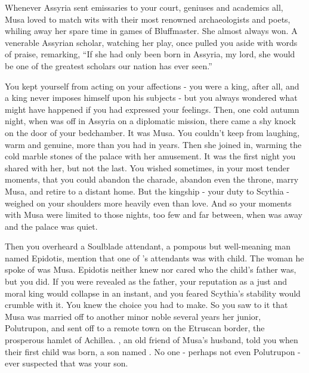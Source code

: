 \documentclass[char]{Kos}
\begin{document}
    Whenever Assyria sent emissaries to your court, geniuses and academics all, Musa loved to match wits with their most renowned archaeologists and poets, whiling away her spare time in games of Bluffmaster. She almost always won. A venerable Assyrian scholar, watching her play, once pulled you aside with words of praise, remarking, ``If she had only been born in Assyria, my lord, she would be one of the greatest scholars our nation has ever seen.''

    You kept yourself from acting on your affections - you were a king, after all, and a king never imposes himself upon his subjects - but you always wondered what might have happened if you had expressed your feelings. Then, one cold autumn night, when \cScythiaQueen{} was off in Assyria on a diplomatic mission, there came a shy knock on the door of your bedchamber. It was Musa. You couldn't keep from laughing, warm and genuine, more than you had in years. Then she joined in, warming the cold marble stones of the palace with her amusement. It was the first night you shared with her, but not the last. You wished sometimes, in your most tender moments, that you could abandon the charade, abandon even the throne, marry Musa, and retire to a distant home. But the kingship - your duty to Scythia - weighed on your shoulders more heavily even than love. And so your moments with Musa were limited to those nights, too few and far between, when \cScythiaQueen{} was away and the palace was quiet.

    Then you overheard a Soulblade attendant, a pompous but well-meaning man named Epidotis, mention that one of \cScythiaQueen{}'s attendants was with child. The woman he spoke of was Musa. Epidotis neither knew nor cared who the child's father was, but you did. If you were revealed as the father, your reputation as a just and moral king would collapse in an instant, and you feared Scythia's stability would crumble with it. You knew the choice you had to make. So you saw to it that Musa was married off to another minor noble several years her junior, Polutrupon, and sent off to a remote town on the Etruscan border, the prosperous hamlet of Achillea. \cScythiaQueen{}, an old friend of Musa's husband, told you when their first child was born, a son named \cWard{}. No one - perhaps not even Polutrupon - ever suspected that \cWard{} was your son.
\end{document}
